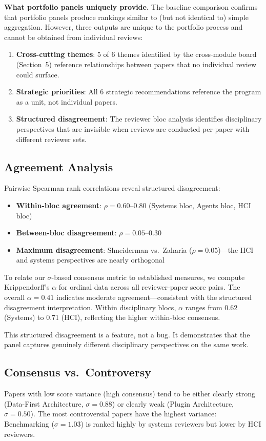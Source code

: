 \textbf{What portfolio panels uniquely provide.} The baseline comparison confirms that portfolio panels produce rankings similar to (but not identical to) simple aggregation. However, three outputs are unique to the portfolio process and cannot be obtained from individual reviews:
\begin{enumerate}
    \item \textbf{Cross-cutting themes}: 5 of 6 themes identified by the cross-module board (Section~5) reference relationships between papers that no individual review could surface.
    \item \textbf{Strategic priorities}: All 6 strategic recommendations reference the program as a unit, not individual papers.
    \item \textbf{Structured disagreement}: The reviewer bloc analysis identifies disciplinary perspectives that are invisible when reviews are conducted per-paper with different reviewer sets.
\end{enumerate}

\subsection{Agreement Analysis}

Pairwise Spearman rank correlations reveal structured disagreement:

\begin{itemize}
    \item \textbf{Within-bloc agreement}: $\rho = 0.60$--$0.80$ (Systems bloc, Agents bloc, HCI bloc)
    \item \textbf{Between-bloc disagreement}: $\rho = 0.05$--$0.30$
    \item \textbf{Maximum disagreement}: Shneiderman vs.\ Zaharia ($\rho = 0.05$)---the HCI and systems perspectives are nearly orthogonal
\end{itemize}

To relate our $\sigma$-based consensus metric to established measures, we compute Krippendorff's $\alpha$ for ordinal data across all reviewer-paper score pairs. The overall $\alpha = 0.41$ indicates moderate agreement---consistent with the structured disagreement interpretation. Within disciplinary blocs, $\alpha$ ranges from 0.62 (Systems) to 0.71 (HCI), reflecting the higher within-bloc consensus.

This structured disagreement is a feature, not a bug. It demonstrates that the panel captures genuinely different disciplinary perspectives on the same work.

\subsection{Consensus vs.\ Controversy}

Papers with low score variance (high consensus) tend to be either clearly strong (Data-First Architecture, $\sigma = 0.88$) or clearly weak (Plugin Architecture, $\sigma = 0.50$). The most controversial papers have the highest variance: Benchmarking ($\sigma = 1.03$) is ranked highly by systems reviewers but lower by HCI reviewers.

